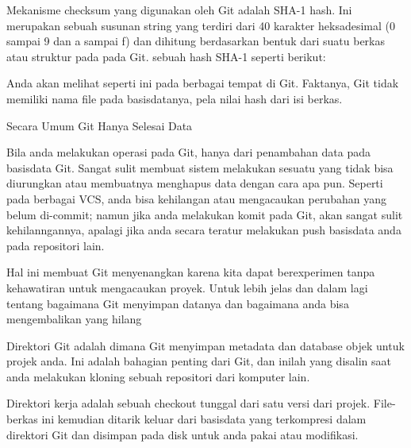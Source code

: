 \vspace{12pt}
\noindent 
Mekanisme checksum yang digunakan oleh Git adalah SHA-1 hash. Ini merupakan sebuah susunan string yang terdiri dari 40 karakter heksadesimal (0 sampai 9 dan a sampai f) dan dihitung berdasarkan bentuk dari suatu berkas atau struktur pada pada Git. sebuah hash SHA-1 seperti berikut: \par
\noindent 
Anda akan melihat seperti ini pada berbagai tempat di Git. Faktanya, Git tidak memiliki nama file pada basisdatanya, pela nilai hash dari isi berkas. \par
\vspace{12pt}
\noindent 
Secara Umum Git Hanya Selesai Data \par
\noindent 
Bila anda melakukan operasi pada Git, hanya dari penambahan data pada basisdata Git. Sangat sulit membuat sistem melakukan sesuatu yang tidak bisa diurungkan atau membuatnya menghapus data dengan cara apa pun. Seperti pada berbagai VCS, anda bisa kehilangan atau mengacaukan perubahan yang belum di-commit; namun jika anda melakukan komit pada Git, akan sangat sulit kehilanngannya, apalagi jika anda secara teratur melakukan push basisdata anda pada repositori lain. \par
\noindent 
Hal ini membuat Git menyenangkan karena kita dapat berexperimen tanpa kehawatiran untuk mengacaukan proyek. Untuk lebih jelas dan dalam lagi tentang bagaimana Git menyimpan datanya dan bagaimana anda bisa mengembalikan yang hilang \par
\noindent 
Direktori Git adalah dimana Git menyimpan metadata dan database objek untuk projek anda. Ini adalah bahagian penting dari Git, dan inilah yang disalin saat anda melakukan kloning sebuah repositori dari komputer lain. \par
\noindent 
Direktori kerja adalah sebuah checkout tunggal dari satu versi dari projek. File-berkas ini kemudian ditarik keluar dari basisdata yang terkompresi dalam direktori Git dan disimpan pada disk untuk anda pakai atau modifikasi. \par
\vspace{12pt}
\vspace{12pt}

